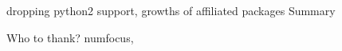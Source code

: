 \documentclass[modern]{aastex61}
\begin{document}
dropping python2 support, growths of affiliated packages
Summary

\acknowledgments

Who to thank?  numfocus, 






\begin{thebibliography}{}

\end{thebibliography}
\end{document}

